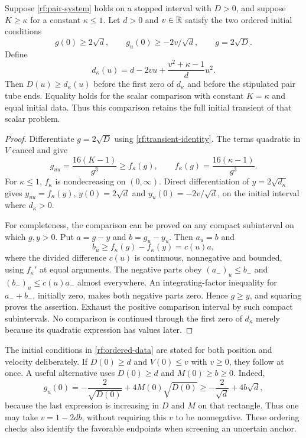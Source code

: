 \begin{theorem}
\label{rf:constant-K}
Suppose \eqref{rf:pair-system} holds on a stopped interval with $D>0$,
and suppose $K\ge\kappa$ for a constant $\kappa\le1$. Let $d>0$ and
$v\in\mathbb R$ satisfy the two ordered initial conditions
\begin{equation}
 g(0)\ge2\sqrt d,\qquad
 g_u(0)\ge-2v/\sqrt d,\qquad g=2\sqrt D.
 \label{rf:ordered-data}
\end{equation}
Define
\begin{equation}
 d_\kappa(u)=d-2vu+\frac{v^2+\kappa-1}{d}u^2.
 \label{rf:constant-K-polynomial}
\end{equation}
Then $D(u)\ge d_\kappa(u)$ before the first zero of $d_\kappa$ and
before the stipulated pair tube ends. Equality holds for the scalar
comparison with constant $K=\kappa$ and equal initial data. Thus this
comparison retains the full initial transient of that scalar problem.
\end{theorem}

\begin{proof}
Differentiate $g=2\sqrt D$ using \eqref{rf:transient-identity}. The
terms quadratic in $V$ cancel and give
\begin{equation}
 g_{uu}=\frac{16(K-1)}{g^3}
       \ge f_\kappa(g),\qquad
 f_\kappa(g)=\frac{16(\kappa-1)}{g^3}.
 \label{rf:gap-acceleration}
\end{equation}
For $\kappa\le1$, $f_\kappa$ is nondecreasing on $(0,\infty)$.
Direct differentiation of $y=2\sqrt{d_\kappa}$ gives
$y_{uu}=f_\kappa(y)$, $y(0)=2\sqrt d$ and
$y_u(0)=-2v/\sqrt d$, on the initial interval where $d_\kappa>0$.

For completeness, the comparison can be proved on any compact
subinterval on which $g,y>0$. Put $a=g-y$ and $b=g_u-y_u$.
Then $a_u=b$ and
\[
 b_u\ge f_\kappa(g)-f_\kappa(y)=c(u)a,
\]
where the divided difference $c(u)$ is continuous, nonnegative and
bounded, using $f_\kappa'$ at equal arguments. The negative parts obey
$(a_-)_u\le b_-$ and $(b_-)_u\le c(u)a_-$ almost everywhere.
An integrating-factor inequality for $a_-+b_-$, initially zero, makes
both negative parts zero. Hence $g\ge y$, and squaring proves the
assertion. Exhaust the positive comparison interval by such compact
subintervals. No comparison is continued through the first zero of
$d_\kappa$ merely because its quadratic expression has values later.
\end{proof}

The initial conditions in \eqref{rf:ordered-data} are stated for both
position and velocity deliberately. If $D(0)\ge d$ and $V(0)\le v$
with $v\ge0$, they follow at once. A useful alternative uses
$D(0)\ge d$ and $M(0)\ge b\ge0$. Indeed,
\[
 g_u(0)=-\frac2{\sqrt{D(0)}}+4M(0)\sqrt{D(0)}
       \ge-\frac2{\sqrt d}+4b\sqrt d,
\]
because the last expression is increasing in $D$ and $M$ on that
rectangle. Thus one may take $v=1-2db$, without requiring this $v$ to
be nonnegative. These ordering checks also identify the favorable
endpoints when screening an uncertain anchor.

